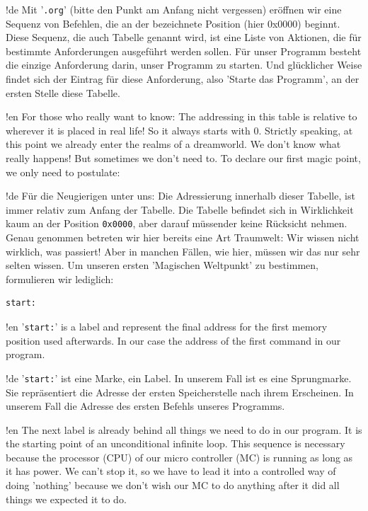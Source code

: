 !de Mit '\texttt{.org}' (bitte den Punkt am Anfang nicht vergessen) eröffnen wir eine Sequenz von Befehlen, die an der bezeichnete Position (hier 0x0000) beginnt. Diese Sequenz, die auch Tabelle genannt wird, ist eine Liste von Aktionen, die für bestimmte Anforderungen ausgeführt werden sollen. Für unser Programm besteht die einzige Anforderung darin, unser Programm zu starten. Und glücklicher Weise findet sich der Eintrag für diese Anforderung, also 'Starte das Programm', an der ersten Stelle diese Tabelle.



!en For those who really want to know: The addressing in this table is relative to wherever it is placed in real life! So it always starts with 0. Strictly speaking, at this point we already enter the realms of a dreamworld. We don't know what really happens! But sometimes we don't need to. To declare our first magic point, we only need to postulate:

!de Für die Neugierigen unter uns: Die Adressierung innerhalb dieser Tabelle, ist immer relativ zum Anfang der Tabelle. Die Tabelle befindet sich in Wirklichkeit kaum an der Position \texttt{0x0000}, aber darauf müssender keine Rücksicht nehmen. Genau genommen betreten wir hier bereits eine Art Traumwelt: Wir wissen nicht wirklich, was passiert! Aber in manchen Fällen, wie hier, müssen wir das nur sehr selten wissen. Um unseren ersten 'Magischen Weltpunkt' zu bestimmen, formulieren wir lediglich:

\begin{lstlisting}
start:
\end{lstlisting}



!en '\texttt{start:}' is a label and represent the final address for the first memory position used afterwards. In our case the address of the first command in our program.

!de '\texttt{start:}' ist eine Marke, ein Label. In unserem Fall ist es eine Sprungmarke. Sie repräsentiert die Adresse der ersten Speicherstelle nach ihrem Erscheinen. In unserem Fall die Adresse des ersten Befehls unseres Programms.



!en The next label is already behind all things we need to do in our program. It is the starting point of an unconditional infinite loop. This sequence is necessary because the processor (CPU) of our micro controller (MC) is running as long as it has power. We can't stop it, so we have to lead it into a controlled way of doing 'nothing' because we don't wish our MC to do anything after it did all things we expected it to do.

